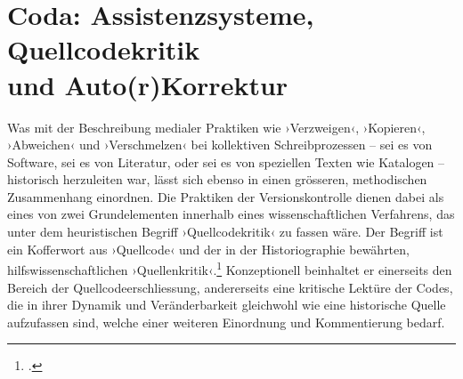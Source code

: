 \documentclass[a4paper,10pt]{article}
\newcommand{\inanf}[1]{›#1‹}
\begin{document}
\section{Coda: Assistenzsysteme, Quellcodekritik\\ und Auto(r)Korrektur}


Was mit der Beschreibung medialer Praktiken wie \inanf{Verzweigen}, \inanf{Kopieren}, \inanf{Abweichen} und \inanf{Verschmelzen} bei kollektiven Schreibprozessen – sei es von Software, sei es von Literatur, oder sei es von speziellen Texten wie Katalogen – historisch herzuleiten war, lässt sich ebenso in einen grösseren, methodischen Zusammenhang einordnen. Die Praktiken der Versionskontrolle dienen dabei als eines von zwei Grundelementen innerhalb eines wissenschaftlichen Verfahrens, das unter dem heuristischen Begriff \inanf{Quellcodekritik} zu fassen wäre. Der Begriff ist ein Kofferwort aus \inanf{Quellcode} und der in der Historiographie bewährten, hilfswissenschaftlichen \inanf{Quellenkritik}.\footcite[Vgl. dazu z.B.][376 ff.]{saxer:2014} Konzeptionell beinhaltet er einerseits den Bereich der Quellcodeerschliessung, andererseits eine kritische Lektüre der Codes, die in ihrer Dynamik und Veränderbarkeit gleichwohl wie eine historische Quelle aufzufassen sind, welche einer weiteren Einordnung und Kommentierung bedarf.  
\end{document}
